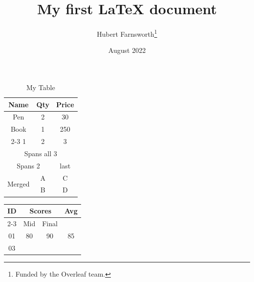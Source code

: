 \documentclass[12pt, letterpaper]{article}
\title{My first LaTeX document}
\author{Hubert Farnsworth\thanks{Funded by the Overleaf team.}}
\date{August 2022}
\begin{document}
\maketitle
\begin{table}[H]
    \centering
    \caption{My Table}
    \label{tab:mine}
    \begin{tabular}{|c|c|c|}
        \hline
        Name & Qty & Price \\
        \hline
        Pen & 2 &30 \\
        \hline
        Book & 1 & 250\\[1ex]
        \cline{2-3}
        1 & 2 & 3\\
        \hline
        \multicolumn{3}{|c|}{Spans all 3} \\
        \hline
        \multicolumn{2}{|c|}{Spans 2} & last\\
        \hline
        \multirow{2}{*}{Merged} & A & C\\
        \cline{2-3}
        & B & D \\
        \hline
        
        
    \end{tabular}
\end{table}

\begin{table}[H]
    \centering
    \begin{tabular}{|c|c|c|c|}
        \hline
        \multirow{2}{*}{ID}
        & \multicolumn{2}{c|}{Scores}
        & \multirow{2}{*}{Avg} \\
        \cline{2-3}
        & Mid & Final & \\
        \hline
        01 & 80 & 90 & 85\\
        \hline
        03

    \end{tabular}
\end{table}
\end{document}
